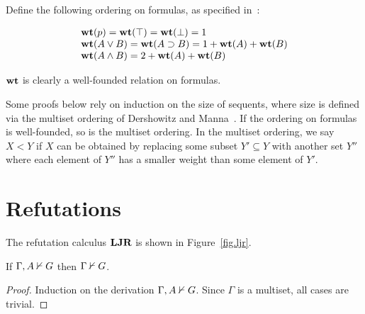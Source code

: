 \documentclass[]{article}
\begin{document}
\begin{definition}
  Define the following ordering on formulas, as specified
  in~\cite{Dyckhoff.1992.JSL}:

  \[
  \begin{array}{l}
    \mathbf{wt}(p) = \mathbf{wt}(\top) = \mathbf{wt}(\bot) = 1 \\
    \mathbf{wt}(A \vee B) = \mathbf{wt}(A \supset B) = 1 + \mathbf{wt}(A) + \mathbf{wt}(B) \\
    \mathbf{wt}(A \wedge B) = 2 + \mathbf{wt}(A) + \mathbf{wt}(B) \\
  \end{array}
  \]

  $\mathbf{wt}$ is clearly a well-founded relation on formulas.
\end{definition}

Some proofs below rely on induction on the size of sequents, where
size is defined via the multiset ordering of Dershowitz and
Manna~\cite{Dershowitz.1979.ALP}. If the ordering on formulas is
well-founded, so is the multiset ordering.  In the multiset ordering,
we say $X < Y$ if $X$ can be obtained by replacing some subset
$Y'\subseteq Y$ with another set $Y''$
where each element of $Y''$ has a smaller weight than some element of
$Y'$.

\section{Refutations}
\label{sec:refutations}

The refutation calculus $\mathbf{LJR}$ is shown in Figure~\ref{fig.ljr}.



\begin{theorem}[Weakening]
  \label{thm:ljr-weaken}
  If $\Gamma, A \nvdash G$ then $\Gamma \nvdash G$.
\end{theorem}
\begin{proof}
  Induction on the derivation $\Gamma, A \nvdash G$.  Since $\Gamma$ is
  a multiset, all cases are trivial.
\end{proof}



\CompleteLemmas
\CompleteTheorem
\CompleteProof



\end{document}
